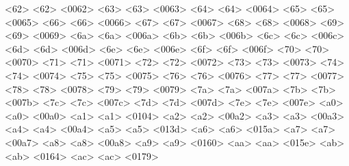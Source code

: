       <62> <62> <0062> %
      <63> <63> <0063> %
      <64> <64> <0064> %
      <65> <65> <0065> %
      <66> <66> <0066> %
      <67> <67> <0067> %
      <68> <68> <0068> %
      <69> <69> <0069> %
      <6a> <6a> <006a> %
      <6b> <6b> <006b> %
      <6c> <6c> <006c> %
      <6d> <6d> <006d> %
      <6e> <6e> <006e> %
      <6f> <6f> <006f> %
      <70> <70> <0070> %
      <71> <71> <0071> %
      <72> <72> <0072> %
      <73> <73> <0073> %
      <74> <74> <0074> %
      <75> <75> <0075> %
      <76> <76> <0076> %
      <77> <77> <0077> %
      <78> <78> <0078> %
      <79> <79> <0079> %
      <7a> <7a> <007a> %
      <7b> <7b> <007b> %
      <7c> <7c> <007c> %
      <7d> <7d> <007d> %
      <7e> <7e> <007e> %
      <a0> <a0> <00a0> %
      <a1> <a1> <0104> %
      <a2> <a2> <00a2> %
      <a3> <a3> <00a3> %
      <a4> <a4> <00a4> %
      <a5> <a5> <013d> %
      <a6> <a6> <015a> %
      <a7> <a7> <00a7> %
      <a8> <a8> <00a8> %
      <a9> <a9> <0160> %
      <aa> <aa> <015e> %
      <ab> <ab> <0164> %
      <ac> <ac> <0179> %
